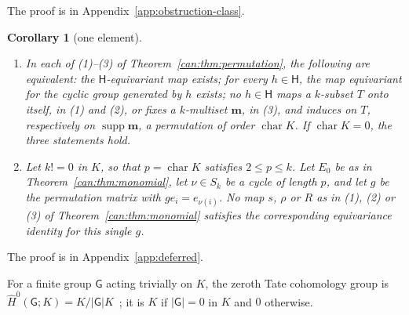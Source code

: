 \documentclass[11pt]{amsart}
\newtheorem{corollary}[theorem]{Corollary}
\theoremstyle{definition}
\theoremstyle{remark}
\numberwithin{equation}{section}
\newcommand{\abs}[1]{\lvert #1\rvert}
\theoremstyle{plain}
\theoremstyle{definition}
\theoremstyle{plain}
\begin{document}
The proof is in Appendix~\ref{app:obstruction-class}.

\begin{corollary}[one element]\label{can:cor:p-cycle}
\begin{enumerate}
\item In each of (1)--(3) of Theorem~\ref{can:thm:permutation}, the following are equivalent: the
$\mathsf H$\nobreakdash-equivariant map exists; for every $h\in\mathsf H$, the map equivariant for the cyclic group
generated by $h$ exists; no $h\in\mathsf H$ maps a $k$\nobreakdash-subset $T$ onto itself, in (1) and (2), or fixes a
$k$\nobreakdash-multiset $\mathbf m$, in (3), and induces on $T$, respectively on $\operatorname{supp}\mathbf m$, a
permutation of order $\operatorname{char}K$. If $\operatorname{char}K=0$, the three statements hold.
\item Let $k!=0$ in $K$, so that $p=\operatorname{char}K$ satisfies $2\le p\le k$. Let $E_0$ be as in
Theorem~\ref{can:thm:monomial}, let $\nu\in S_k$ be a cycle of length $p$, and let $g$ be the permutation matrix with
$ge_i=e_{\nu(i)}$. No map $s$, $\rho$ or $R$ as in (1), (2) or (3) of Theorem~\ref{can:thm:monomial} satisfies the
corresponding equivariance identity for this single $g$.
\end{enumerate}
\end{corollary}

The proof is in Appendix~\ref{app:deferred}.

For a finite group $\mathsf G$ acting trivially on $K$, the zeroth Tate cohomology group is
$\widehat H^0(\mathsf G;K)=K/\abs{\mathsf G}K$~\cite[Ch.~VI]{Br}; it is $K$ if $\abs{\mathsf G}=0$ in $K$ and $0$
otherwise.
\end{document}
